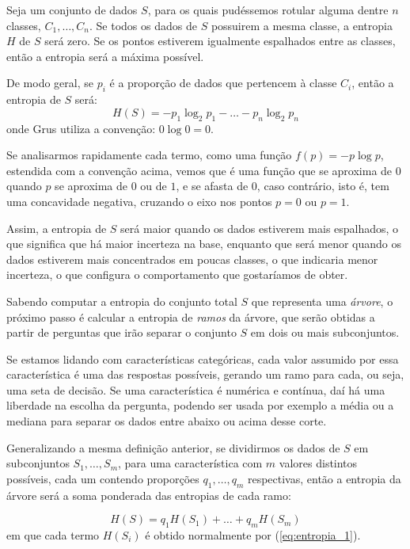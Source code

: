 Seja um conjunto de dados $S$, para os quais pudéssemos rotular alguma dentre $n$ classes, $C_1, \ldots, C_n$. Se todos os dados de $S$ possuirem a mesma classe, a entropia $H$ de $S$ será zero. Se os pontos estiverem igualmente espalhados entre as classes, então a entropia será a máxima possível.

De modo geral, se $p_i$ é a proporção de dados que pertencem à classe $C_i$, então a entropia de $S$ será:
\begin{equation}\label{eq:entropia_1}
H(S) = -p_1 \log_2 p_1 - \ldots - p_n \log_2 p_n
\end{equation}
onde Grus \citep{data} utiliza a convenção: $0 \log 0 = 0$.

Se analisarmos rapidamente cada termo, como uma função $f(p) = {-p} \log p$, estendida com a convenção acima, vemos que é uma função que se aproxima de $0$ quando $p$ se aproxima de $0$ ou de $1$, e se afasta de $0$, caso contrário, isto é, tem uma concavidade negativa, cruzando o eixo nos pontos $p=0$ ou $p=1$.

Assim, a entropia de $S$ será maior quando os dados estiverem mais espalhados, o que significa que há maior incerteza na base, enquanto que será menor quando os dados estiverem mais concentrados em poucas classes, o que indicaria menor incerteza, o que configura o comportamento que gostaríamos de obter.

Sabendo computar a entropia do conjunto total $S$ que representa uma \emph{árvore}, o próximo passo é calcular a entropia de \emph{ramos} da árvore, que serão obtidas a partir de perguntas que irão separar o conjunto $S$ em dois ou mais subconjuntos.

Se estamos lidando com características categóricas, cada valor assumido por essa característica é uma das respostas possíveis, gerando um ramo para cada, ou seja, uma seta de decisão. Se uma característica é numérica e contínua, daí há uma liberdade na escolha da pergunta, podendo ser usada por exemplo a média ou a mediana para separar os dados entre abaixo ou acima desse corte.

Generalizando a mesma definição anterior, se dividirmos os dados de $S$ em subconjuntos $S_1, \ldots, S_m$, para uma característica com $m$ valores distintos possíveis, cada um contendo proporções $q_1, \ldots, q_m$ respectivas, então a entropia da árvore será a soma ponderada das entropias de cada ramo:

\begin{equation}\label{eq:entropia_2}
H(S) = q_1 H(S_1) + \ldots + q_m H(S_m)
\end{equation}
em que cada termo $H(S_i)$ é obtido normalmente por (\ref{eq:entropia_1}).

